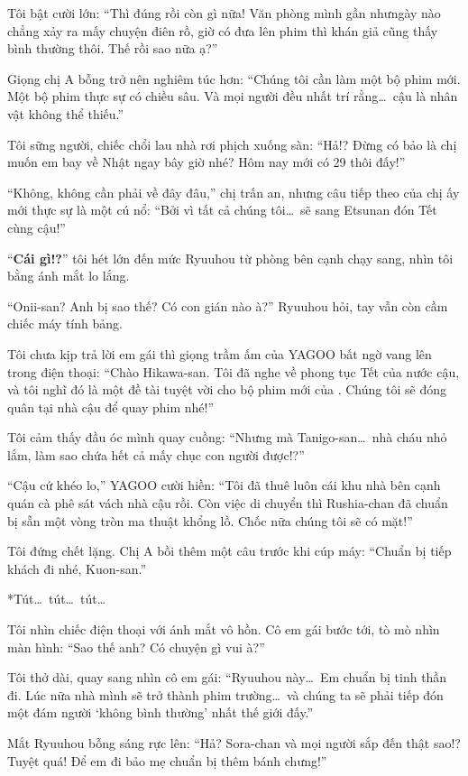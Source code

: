 \documentclass[../main.tex]{subfiles}
\begin{document}
Tôi bật cười lớn: ``Thì đúng rồi còn gì nữa! Văn phòng mình gần nhưngày nào chẳng xảy ra mấy chuyện điên rồ, giờ có đưa lên phim thì khán giả cũng thấy bình thường thôi. Thế rồi sao nữa ạ?''

Giọng chị A bỗng trở nên nghiêm túc hơn: ``Chúng tôi cần làm một bộ phim mới. Một bộ phim thực sự có chiều sâu. Và mọi người đều nhất trí rằng\dots\ cậu là nhân vật không thể thiếu.''

Tôi sững người, chiếc chổi lau nhà rơi phịch xuống sàn: ``Hả!? Đừng có bảo là chị muốn em bay về Nhật ngay bây giờ nhé? Hôm nay mới có 29 thôi đấy!''

``Không, không cần phải về đây đâu,'' chị trấn an, nhưng câu tiếp theo của chị ấy mới thực sự là một cú nổ: ``Bởi vì tất cả chúng tôi\dots\ sẽ sang Etsunan đón Tết cùng cậu!''

``\textbf{Cái gì!?}'' tôi hét lớn đến mức Ryuuhou từ phòng bên cạnh chạy sang, nhìn tôi bằng ánh mắt lo lắng.

``Onii-san? Anh bị sao thế? Có con gián nào à?'' Ryuuhou hỏi, tay vẫn còn cầm chiếc máy tính bảng.

Tôi chưa kịp trả lời em gái thì giọng trầm ấm của YAGOO bất ngờ vang lên trong điện thoại: ``Chào Hikawa-san. Tôi đã nghe về phong tục Tết của nước cậu, và tôi nghĩ đó là một đề tài tuyệt vời cho bộ phim mới của \hll. Chúng tôi sẽ đóng quân tại nhà cậu để quay phim nhé!''

Tôi cảm thấy đầu óc mình quay cuồng: ``Nhưng mà Tanigo-san\dots\ nhà cháu nhỏ lắm, làm sao chứa hết cả mấy chục con người được!?''

``Cậu cứ khéo lo,'' YAGOO cười hiền: ``Tôi đã thuê luôn cái khu nhà bên cạnh quán cà phê sát vách nhà cậu rồi. Còn việc di chuyển thì Rushia-chan đã chuẩn bị sẵn một vòng tròn ma thuật khổng lồ. Chốc nữa chúng tôi sẽ có mặt!''

Tôi đứng chết lặng. Chị A bồi thêm một câu trước khi cúp máy: ``Chuẩn bị tiếp khách đi nhé, Kuon-san.''

*Tút\dots\ tút\dots\ tút\dots*

Tôi nhìn chiếc điện thoại với ánh mắt vô hồn. Cô em gái bước tới, tò mò nhìn màn hình: ``Sao thế anh? Có chuyện gì vui à?''

Tôi thở dài, quay sang nhìn cô em gái: ``Ryuuhou này\dots\ Em chuẩn bị tinh thần đi. Lúc nữa nhà mình sẽ trở thành phim trường\dots\ và chúng ta sẽ phải tiếp đón một đám người `không bình thường' nhất thế giới đấy.''

Mắt Ryuuhou bỗng sáng rực lên: ``Hả? Sora-chan và mọi người sắp đến thật sao!? Tuyệt quá! Để em đi bảo mẹ chuẩn bị thêm bánh chưng!''
\end{document}
